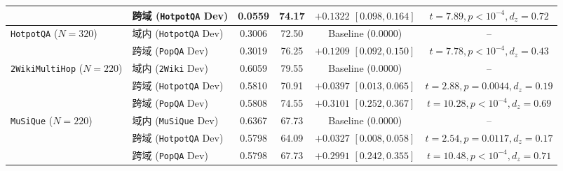 \documentclass[11pt]{article}
\begin{document}
\begin{table}[t]
{\begin{tabular}{llcccc}
& 跨域 (\texttt{HotpotQA} Dev) & 0.0559 & 74.17 & $+0.1322$ $[0.098, 0.164]$ & $t=7.89, p<10^{-4}, d_z=0.72$ \\
\midrule
\multirow{2}{*}{\texttt{HotpotQA} ($N=320$)} & 域内 (\texttt{HotpotQA} Dev) & 0.3006 & 72.50 & Baseline ($0.0000$) & -- \\
& 跨域 (\texttt{PopQA} Dev) & 0.3019 & 76.25 & $+0.1209$ $[0.092, 0.150]$ & $t=7.78, p<10^{-4}, d_z=0.43$ \\
\midrule
\multirow{3}{*}{\texttt{2WikiMultiHop} ($N=220$)} & 域内 (\texttt{2Wiki} Dev) & 0.6059 & 79.55 & Baseline ($0.0000$) & -- \\
& 跨域 (\texttt{HotpotQA} Dev) & 0.5810 & 70.91 & $+0.0397$ $[0.013, 0.065]$ & $t=2.88, p=0.0044, d_z=0.19$ \\
& 跨域 (\texttt{PopQA} Dev) & 0.5808 & 74.55 & $+0.3101$ $[0.252, 0.367]$ & $t=10.28, p<10^{-4}, d_z=0.69$ \\
\midrule
\multirow{3}{*}{\texttt{MuSiQue} ($N=220$)} & 域内 (\texttt{MuSiQue} Dev) & 0.6367 & 67.73 & Baseline ($0.0000$) & -- \\
& 跨域 (\texttt{HotpotQA} Dev) & 0.5798 & 64.09 & $+0.0327$ $[0.008, 0.058]$ & $t=2.54, p=0.0117, d_z=0.17$ \\
& 跨域 (\texttt{PopQA} Dev) & 0.5798 & 67.73 & $+0.2991$ $[0.242, 0.355]$ & $t=10.48, p<10^{-4}, d_z=0.71$ \\
\bottomrule
\end{tabular}
}
\end{table}
\end{document}
